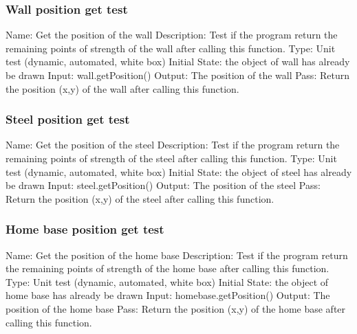 \documentclass{article}
\begin{document}
\subsubsection{Wall position get test}
Name:  Get the position of the wall\newline
Description: Test if the program return the remaining points of strength of the wall after calling this function. \newline
Type: Unit test (dynamic, automated, white box) \newline
Initial State:  the object of wall has already be drawn\newline
Input: wall.getPosition()\newline
Output: The position of the wall\newline
Pass:  Return the position (x,y) of the wall after calling this function. \newline

\subsubsection{Steel position get test}
Name:  Get the position of the steel\newline
Description: Test if the program return the remaining points of strength of the steel after calling this function. \newline
Type: Unit test (dynamic, automated, white box) \newline
Initial State:  the object of steel has already be drawn\newline
Input: steel.getPosition()\newline
Output: The position of the steel\newline
Pass:  Return the position (x,y) of the steel after calling this function. \newline

\subsubsection{Home base position get test}
Name:  Get the position of the home base\newline
Description: Test if the program return the remaining points of strength of the home base after calling this function. \newline
Type: Unit test (dynamic, automated, white box) \newline
Initial State:  the object of home base has already be drawn\newline
Input: homebase.getPosition()\newline
Output: The position of the home base\newline
Pass:  Return the position (x,y) of the home base after calling this function. \newline
\end{document}

